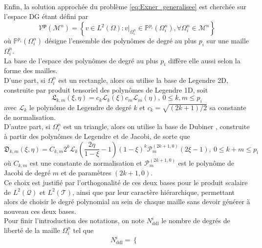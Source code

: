 \documentclass[11pt, a4paper, oneside]{report}
\newcommand{\restricdynamic}[2]{\left.#1\right\vert_{#2}}
\newcommand{\LegendreL}{\mathfrak{L}}
\newcommand{\DubinerD}{\mathfrak{D}}
\begin{document}
\begin{samepage}
Enfin, la solution approchée du problème \eqref{eq:Exner_generalisee} est cherchée sur l'espace DG étant défini par
\begin{equation}
    \mathcal{V}^\mathbf{p}(\mathcal{M}^n) = \left\{ v \in L^2(\Omega) : \restricdynamic{v}{\Omega_i^n} \in \mathbb{P}^{p_i}(\Omega_i^n), \forall \Omega_i^n \in \mathcal{M}^n \right\}
\end{equation}
où $\displaystyle \mathbb{P}^{p_i}(\Omega_i^n)$ désigne l'ensemble des polynômes de degré au plus $p_i$ sur une maille $\Omega_i^n$. \\
La base de l'espace des polynômes de degré au plus $p_i$ diffère elle aussi selon la forme des mailles. \\
D'une part, si $\Omega_i^n$ est un rectangle, alors on utilise la base de Legendre 2D, construite par produit tensoriel des polynômes de Legendre 1D, soit
\begin{equation}
    \LegendreL_{k, m}(\xi, \eta) = c_k \mathcal{L}_k(\xi) c_m \mathcal{L}_m(\eta), ~ 0 \leq k, m \leq p_i
\end{equation}
avec $\mathcal{L}_k$ le polynôme de Legendre de degré $k$ et $c_k = \sqrt{(2k+1)/2}$ sa constante de normalisation. \\
D'autre part, si $\Omega_i^n$ est un triangle, alors on utilise la base de Dubiner \cite{dubiner1991spectral}, construite à partir des polynômes de Legendre et de Jacobi, de sorte que
\begin{equation}
    \DubinerD_{k, m}(\xi, \eta) = C_{k, m} 2^k \mathcal{L}_k \left( \frac{2 \eta}{1 - \xi} - 1 \right) (1 - \xi)^k \mathcal{P}_m^{(2k+1, 0)}(2 \xi - 1), ~ 0 \leq k + m \leq p_i
\end{equation}
où $C_{k, m}$ est une constante de normalisation et $\mathcal{P}_m^{(2k+1, 0)}$ est le polynôme de Jacobi de degré $m$ et de paramètres $(2k+1, 0)$. \\
Ce choix est justifié par l'orthogonalité de ces deux bases pour le produit scalaire de $L^2(\mathcal{Q})$ et $L^2(\mathcal{T})$, ainsi que par leur caractère hiérarchique, permettant alors de choisir le degré polynomial au sein de chaque maille sans devoir générer à nouveau ces deux bases. \\
Pour finir l'introduction des notations, on note $N_\text{ddl}^i$ le nombre de degrés de liberté de la maille $\Omega_i^n$ tel que
\begin{equation}
    N_\text{ddl}^i =
    \left \{
    \begin{aligned}

\end{aligned}
\end{equation}
\end{samepage}
\end{document}
